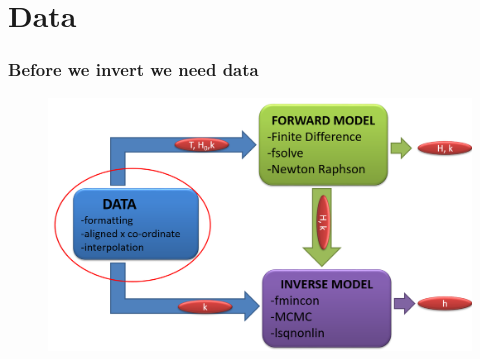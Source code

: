 \documentclass[7pt]{beamer}
\begin{document}
\section{Data}

\begin{frame}
    \frametitle{Before we invert we need data}
        \begin{figure}[flowchart]
        \includegraphics[width=1.0\linewidth]{img/Focus_D.png}
        \end{figure}
\end{frame}
\end{document}
